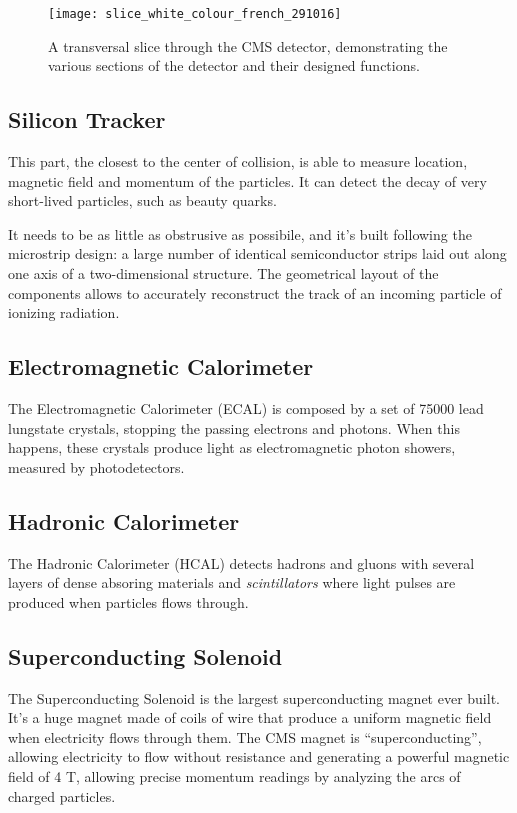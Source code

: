 \begin{figure}
	\centerline{
		\texttt{[image: slice\_white\_colour\_french\_291016]}}
	\caption{A transversal slice through the CMS detector, demonstrating the various sections of the detector
		and their designed functions. \cite{Barney:2628641}}
	\label{fig:cms2}
\end{figure}

\subsection{Silicon Tracker}

This part, the closest to the center of collision, is able to measure location, magnetic field and momentum of the particles. It can detect the decay of very short-lived particles, such as beauty quarks.

It needs to be as little as obstrusive as possibile, and it's built following the microstrip design: a large number of identical semiconductor strips laid out along one axis of a two-dimensional structure. The geometrical layout of the components allows to accurately reconstruct the track of an incoming particle of ionizing radiation.

\subsection{Electromagnetic Calorimeter}

The Electromagnetic Calorimeter (ECAL) is composed by a set of 75000 lead lungstate crystals, stopping the passing electrons and photons. When this happens, these crystals produce light as electromagnetic photon showers, measured by photodetectors.


\subsection{Hadronic Calorimeter}

The Hadronic Calorimeter (HCAL) detects hadrons and gluons with several layers of dense absoring materials and \textit{scintillators} where light pulses are produced when particles flows through.

\subsection{Superconducting Solenoid}

The Superconducting Solenoid is the largest superconducting magnet ever built. It's a huge magnet made of coils of wire that produce a uniform magnetic field when electricity flows through them. The CMS magnet is “superconducting”, allowing electricity to flow without resistance and generating a powerful magnetic field of 4 T, allowing precise momentum readings by analyzing the arcs of charged particles.

